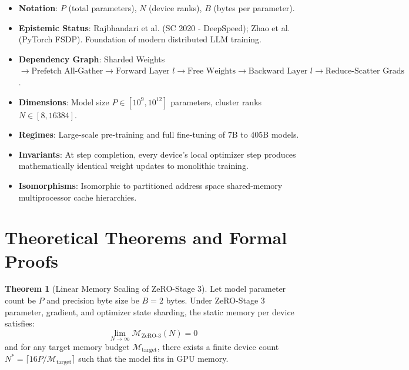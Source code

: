 \documentclass[11pt,a4paper]{article}
\theoremstyle{definition}
\newtheorem{theorem}{\textbf{Theorem}}[section]
\begin{document}
\begin{itemize}
    \item \textbf{Notation}: $P$ (total parameters), $N$ (device ranks), $B$ (bytes per parameter).
    \item \textbf{Epistemic Status}: Rajbhandari et al. (SC 2020 - DeepSpeed); Zhao et al. (PyTorch FSDP). Foundation of modern distributed LLM training.
    \item \textbf{Dependency Graph}: Sharded Weights $\to \text{Prefetch All-Gather} \to \text{Forward Layer } l \to \text{Free Weights} \to \text{Backward Layer } l \to \text{Reduce-Scatter Grads}$.
    \item \textbf{Dimensions}: Model size $P \in [10^9, 10^{12}]$ parameters, cluster ranks $N \in [8, 16384]$.
    \item \textbf{Regimes}: Large-scale pre-training and full fine-tuning of 7B to 405B models.
    \item \textbf{Invariants}: At step completion, every device's local optimizer step produces mathematically identical weight updates to monolithic training.
    \item \textbf{Isomorphisms}: Isomorphic to partitioned address space shared-memory multiprocessor cache hierarchies.
\end{itemize}

\section{Theoretical Theorems and Formal Proofs}

\begin{theorem}[Linear Memory Scaling of ZeRO-Stage 3]
Let model parameter count be $P$ and precision byte size be $B = 2$ bytes. Under ZeRO-Stage 3 parameter, gradient, and optimizer state sharding, the static memory per device satisfies:
{\boldmath
\begin{equation}
\lim_{N \to \infty} \mathcal{M}_{\text{ZeRO-3}}(N) = 0
\end{equation}
}
and for any target memory budget $\mathcal{M}_{\text{target}}$, there exists a finite device count $N^* = \lceil 16P / \mathcal{M}_{\text{target}} \rceil$ such that the model fits in GPU memory.
\end{theorem}
\end{document}
